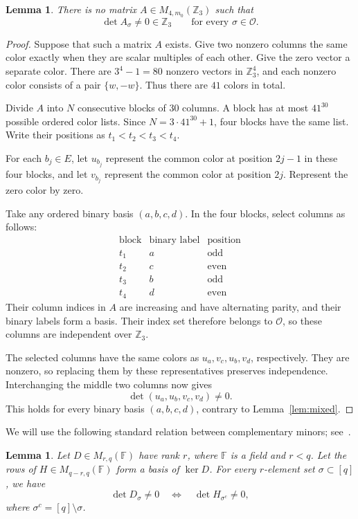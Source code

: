 \documentclass[10pt,a4paper]{amsart}
\theoremstyle{plain}
\newtheorem{lemma}[theorem]{Lemma}
\numberwithin{equation}{section}
\theoremstyle{remark}
\theoremstyle{definition}
\newcommand{\Z}{\mathbb Z}
\newcommand{\F}{\mathbb F}
\newcommand{\cO}{\mathcal O}
\begin{document}
\begin{lemma}\label{lem:repeat}
    There is no matrix $A\in M_{4,m_0}(\Z_3)$ such that
    $$
        \det A_\sigma\ne0 \in \Z_3 \qquad\text{for every }\sigma\in\cO.
    $$
\end{lemma}
\begin{proof}
    Suppose that such a matrix $A$ exists.
    Give two nonzero columns the same color exactly when they are scalar multiples of each other.
    Give the zero vector a separate color.
    There are $3^4-1=80$ nonzero vectors in $\Z_3^4$, and each nonzero color consists of a pair $\{w,-w\}$.
    Thus there are $41$ colors in total.
    
    Divide $A$ into $N$ consecutive blocks of $30$ columns.
    A block has at most $41^{30}$ possible ordered color lists.
    Since $N=3\cdot41^{30}+1$, four blocks have the same list.
    Write their positions as $t_1<t_2<t_3<t_4$.
    
    For each $b_j\in E$, let $u_{b_j}$ represent the common color at position $2j-1$ in these four blocks, and let $v_{b_j}$ represent the common color at position $2j$.
    Represent the zero color by zero.
    
    Take any ordered binary basis $(a,b,c,d)$.
    In the four blocks, select columns as follows:
    \[
    \begin{array}{c|c|c}
        \text{block} & \text{binary label} & \text{position}\\ \hline
        t_1 & a & \text{odd}\\
        t_2 & c & \text{even}\\
        t_3 & b & \text{odd}\\
        t_4 & d & \text{even}
    \end{array}
    \]
    Their column indices in $A$ are increasing and have alternating parity, and their binary labels form a basis.
    Their index set therefore belongs to $\cO$, so these columns are independent over $\Z_3$.
    
    The selected columns have the same colors as $u_a,v_c,u_b,v_d$, respectively.
    They are nonzero, so replacing them by these representatives preserves independence. 
    Interchanging the middle two columns now gives
    $$
        \det(u_a,u_b,v_c,v_d)\ne0.
    $$
    This holds for every binary basis $(a,b,c,d)$, contrary to Lemma~\ref{lem:mixed}.
\end{proof}

We will use the following standard relation between complementary minors; see~\cite[Theorem~2.2.8]{Oxley2011book}.
\begin{lemma}\label{lem:complementary-minors}
    Let $D\in M_{r,q}(\F)$ have rank $r$, where $\F$ is a field and $r<q$.
    Let the rows of $H\in M_{q-r,q}(\F)$ form a basis of $\ker D$.
    For every $r$-element set $\sigma\subset[q]$, we have
    $$
        \det D_\sigma\ne0 \quad\Longleftrightarrow\quad \det H_{\sigma^c}\ne0,
    $$
    where $\sigma^c=[q]\setminus\sigma$.
\end{lemma}
\end{document}
